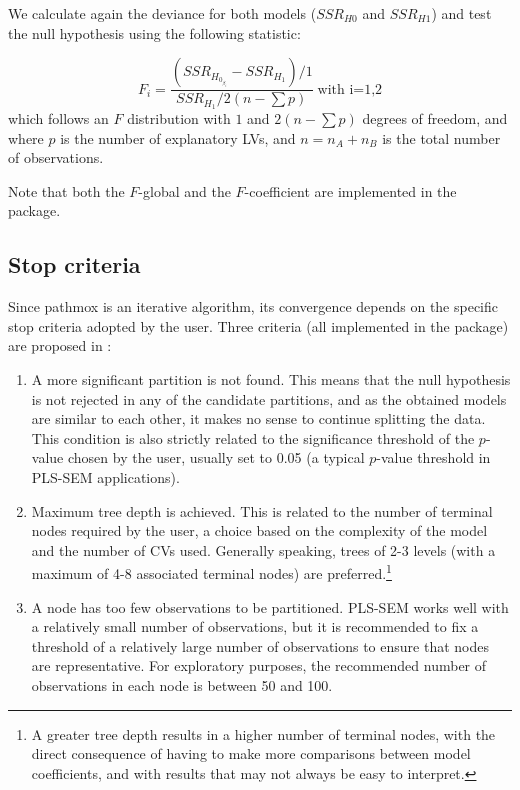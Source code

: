 We calculate again the deviance for both models ($SSR_{H0}$ and $SSR_{H1}$) and test the null hypothesis using the following statistic: 

\begin{equation}
\label{F_coefl}
F_i  = \frac{\left(SSR_{H_{0_{\beta_i}}}-SSR_{H_1}\right) \Bigg/1}{SSR_{H_1}\Bigg/2\left(n-\sum p\right)}  \; \text{with i=1,2}
\end{equation}
which follows an $F$ distribution with $1$ and $2\left(n - \sum p\right)$ degrees of freedom, and where $p$ is the number of explanatory LVs, and  $n = n_A + n_B$ is the total number of observations.

Note that both the $F$-global and the $F$-coefficient are implemented in the  package.

\subsection{Stop criteria}

Since pathmox is an iterative algorithm, its convergence depends on the specific stop criteria adopted by the user.  Three criteria (all implemented in the  package) are proposed in \citet{Lamberti16}:

\begin{enumerate}
\item A more significant partition is not found. This means that the null hypothesis is not rejected in any of the candidate partitions, and as the obtained models are similar to each other, it makes no sense to continue splitting the data. This condition is also strictly related to the significance threshold of the $p$-value chosen by the user, usually set to 0.05 (a typical $p$-value threshold in PLS-SEM applications).

\item Maximum tree depth is achieved. This is related to the number of terminal nodes required by the user, a choice based on the complexity of the model and the number of CVs used. Generally speaking, trees of 2-3 levels (with a maximum of 4-8 associated terminal nodes) are preferred.\footnote{A greater tree depth results in a higher number of terminal nodes, with the direct consequence of having to make more comparisons between model coefficients, and with results that may not always be easy to interpret.}

\item A node has too few observations to be partitioned. PLS-SEM works well with a relatively small number of observations, but it is recommended to fix a threshold of a relatively large number of observations to ensure that nodes are representative. For exploratory purposes, the recommended number of observations in each node is between 50 and 100.  

\end{enumerate}

